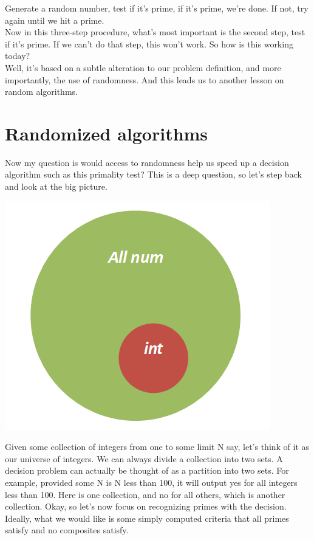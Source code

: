 \documentclass{report}
\begin{document}
Generate a random number, test if it's prime, if it's prime, we're done. If not, try again until we hit a prime. \\
Now in this three-step procedure, what's most important is the second step, test if it's prime. If we can't do that step, this won't work. So how is this working today?\\
Well, it's based on a subtle alteration to our problem definition, and more importantly, the use of randomness. And this leads us to another lesson on random algorithms. 

\chapter{Randomized algorithms}
\newpage
Now my question is would access to randomness help us speed up a decision algorithm such as this primality test? 
This is a deep question, so let's step back and look at the big picture. 
\begin{center}
	\includegraphics[scale=1]{71.png}
\end{center}
Given some collection of integers from one to some limit N say, let's think of it as our universe of integers. We can always divide a collection into two sets. A decision problem can actually be thought of as a partition into two sets. For example, provided some N is N less than 100, it will output yes for all integers less than 100. Here is one collection, and no for all others, which is another collection. Okay, so let's now focus on recognizing primes with the decision. Ideally, what we would like is some simply computed criteria that all primes satisfy and no composites satisfy.
\end{document}
